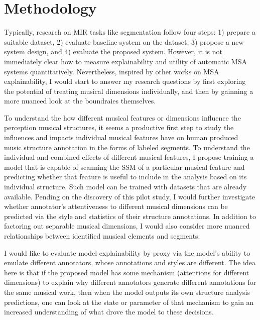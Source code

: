\section{Methodology}
Typically, research on MIR tasks like segmentation follow four steps: 1) prepare a suitable dataset, 2) evaluate baseline system on the dataset, 3) propose a new system design, and 4) evaluate the proposed system.
However, it is not immediately clear how to measure explainability and utility of automatic MSA systems quantitatively.
Nevertheless, inspired by other works on MSA explainability, I would start to answer my research questions by first exploring the potential of treating musical dimensions individually, and then by gainning a more nuanced look at the boundraies themselves.

To understand the how different musical features or dimensions influence the perception musical structures, it seems a productive first step to study the influences and impacts individual musical features have on human produced music structure annotation in the forms of labeled segments.
To understand the individual and combined effects of different musical features, I propose training a model that is capable of scanning the SSM of a particular musical feature and predicting whether that feature is useful to include in the analysis based on its individual structure.
Such model can be trained with datasets that are already available.
Pending on the discovery of this pilot study, I would further investigate whether annotator's attentiveness to different musical dimensions can be predicted via the style and statistics of their structure annotations.
In addition to factoring out separable musical dimensions, I would also consider more nuanced relationships between identified musical elements and segments.

I would like to evaluate model explainability by proxy via the model's ability to emulate different annotators, whose annotations and styles are different.
The idea here is that if the proposed model has some mechanism (attentions for different dimensions) to explain why different annotators generate different annotations for the same musical work, then when the model outputs its own structure analysis predictions, one can look at the state or parameter of that mechanism to gain an increased understanding of what drove the model to these decisions.